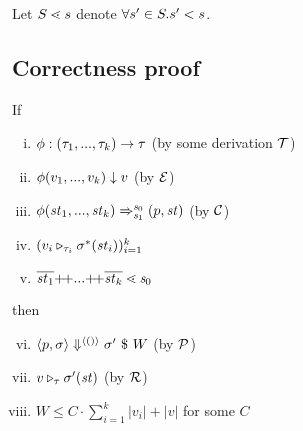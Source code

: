 \begin{nota}
	Let $\S \.< s$ denote $\forall s' \in \S. s' < s$.
\end{nota}



\subsection{Correctness proof}

\begin{lem}
	
\end{lem}

\begin{lem}
	\label{function-correctness}
	If 
	\begin{enumerate}[(i)]
	\item $\Typef{\hcall}{\replc{k}{\tau}}\tau$ (by some derivation $\MT$)
	\item $\EvalF{\hcall}{\replc{k}{v}}{v}$ (by $\ME$)
	\item $\Transf{\hcall}{\replc k {\st}} {\s_0} {\s_1} {\sfun{p}{\st}}$ (by $\MC$)
 	\item $(\ValRep{v_i}{\tau_i}{\sgm^*(\st_i)})^k_{i=1}$
 	\item $\ol{\st_1} {\++} ... {\++} \ol{\st_k} \.< \s_0$
	\end{enumerate}
 	then 
 	\begin{enumerate}[(i)]
 		\setcounter{enumi}{5}
 		\item $\seval{p}{\sgm}{\vunit}{\sgm'}{W}$ (by $\MP$)
 		\item $\ValRep{v}{\tau}{\sgm'(\st)}$ (by $\MR$)
 		\item $W \le C \cdot \sum_{i=1}^{k}|v_i| + |v|$ for some $C$

 	\end{enumerate}
\end{lem}

